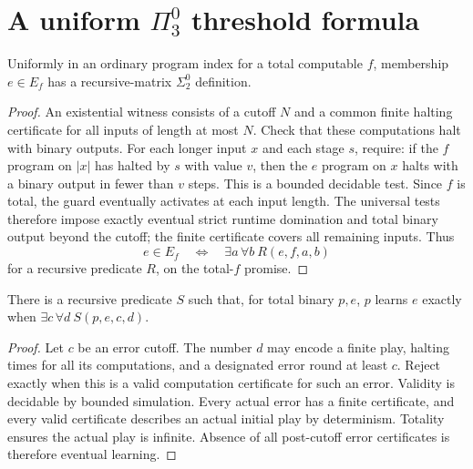 \documentclass[11pt]{article}
\begin{document}
\section{A uniform \texorpdfstring{$\Pi^0_3$}{Pi-0-3} threshold formula}

\begin{lemma}\label{lem:membership}
Uniformly in an ordinary program index for a total computable $f$,
membership $e\in E_f$ has a recursive-matrix $\Sigma^0_2$ definition.
\end{lemma}
\begin{proof}
An existential witness consists of a cutoff $N$ and a common finite
halting certificate for all inputs of length at most $N$. Check that
these computations halt with binary outputs. For each longer input
$x$ and each stage $s$, require: if the $f$ program on $|x|$ has
halted by $s$ with value $v$, then the $e$ program on $x$ halts with
a binary output in fewer than $v$ steps. This is a bounded decidable
test. Since $f$ is total, the guard eventually activates at each input
length. The universal tests therefore impose exactly eventual strict
runtime domination and total binary output beyond the cutoff; the
finite certificate covers all remaining inputs. Thus
\[
 e\in E_f\quad\Longleftrightarrow\quad
 \exists a\,\forall b\ R(e,f,a,b)
\]
for a recursive predicate $R$, on the total-$f$ promise.
\end{proof}

\begin{lemma}\label{lem:learning}
There is a recursive predicate $S$ such that, for total binary $p,e$,
$p$ learns $e$ exactly when
$\exists c\,\forall d\ S(p,e,c,d)$.
\end{lemma}
\begin{proof}
Let $c$ be an error cutoff. The number $d$ may encode a finite play,
halting times for all its computations, and a designated error round
at least $c$. Reject exactly when this is a valid computation
certificate for such an error. Validity is decidable by bounded
simulation. Every actual error has a finite certificate, and every
valid certificate describes an actual initial play by determinism.
Totality ensures the actual play is infinite. Absence of all
post-cutoff error certificates is therefore eventual learning.
\end{proof}
\end{document}
